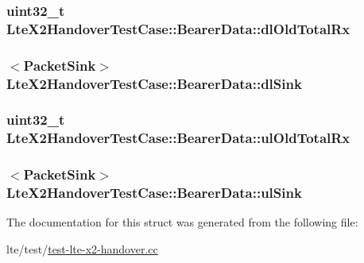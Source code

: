 \subsubsection[{\texorpdfstring{dl\+Old\+Total\+Rx}{dlOldTotalRx}}]{\setlength{\rightskip}{0pt plus 5cm}uint32\+\_\+t Lte\+X2\+Handover\+Test\+Case\+::\+Bearer\+Data\+::dl\+Old\+Total\+Rx}\hypertarget{structLteX2HandoverTestCase_1_1BearerData_a35d5d2212465c43653837086aca5ef2f}{}\label{structLteX2HandoverTestCase_1_1BearerData_a35d5d2212465c43653837086aca5ef2f}
\subsubsection[{\texorpdfstring{dl\+Sink}{dlSink}}]{$<${\bf Packet\+Sink}$>$ Lte\+X2\+Handover\+Test\+Case\+::\+Bearer\+Data\+::dl\+Sink}\hypertarget{structLteX2HandoverTestCase_1_1BearerData_aaf75fc77bed46bb7bec16abde9b38c19}{}\label{structLteX2HandoverTestCase_1_1BearerData_aaf75fc77bed46bb7bec16abde9b38c19}
\subsubsection[{\texorpdfstring{ul\+Old\+Total\+Rx}{ulOldTotalRx}}]{\setlength{\rightskip}{0pt plus 5cm}uint32\+\_\+t Lte\+X2\+Handover\+Test\+Case\+::\+Bearer\+Data\+::ul\+Old\+Total\+Rx}\hypertarget{structLteX2HandoverTestCase_1_1BearerData_aae69151d8c855305994e68f3b2b7d244}{}\label{structLteX2HandoverTestCase_1_1BearerData_aae69151d8c855305994e68f3b2b7d244}
\subsubsection[{\texorpdfstring{ul\+Sink}{ulSink}}]{$<${\bf Packet\+Sink}$>$ Lte\+X2\+Handover\+Test\+Case\+::\+Bearer\+Data\+::ul\+Sink}\hypertarget{structLteX2HandoverTestCase_1_1BearerData_ae3811c336998dfdc65157a4154e9fa9d}{}\label{structLteX2HandoverTestCase_1_1BearerData_ae3811c336998dfdc65157a4154e9fa9d}


The documentation for this struct was generated from the following file\+:\begin{DoxyCompactItemize}
\item 
lte/test/\hyperlink{test-lte-x2-handover_8cc}{test-\/lte-\/x2-\/handover.\+cc}\end{DoxyCompactItemize}

